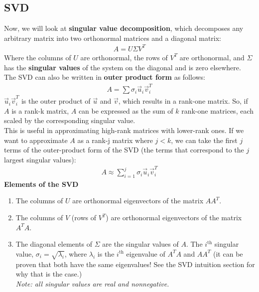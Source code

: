 \subsection*{SVD}
Now, we will look at \textbf{singular value decomposition}, which decomposes any arbitrary matrix into two orthonormal matrices and a diagonal matrix:
\begin{align*}
    \boxed{A = U \Sigma V^T} 
\end{align*}
Where the columns of $U$ are orthonormal, the rows of $V^T$ are orthonormal, and $\Sigma$ has the \textbf{singular values} of the system on the diagonal and is zero elsewhere. \\
\newline
The SVD can also be written in \textbf{outer product form} as follows:
\begin{align*}
    \boxed{A = \sum \sigma_i \vec{u}_i \vec{v}^T_i}
\end{align*}
$\vec{u}_i \vec{v}^T_i$ is the outer product of $\vec{u}$ and $\vec{v}$, which results in a rank-one matrix. So, if $A$ is a rank-k matrix, $A$ can be expressed as the sum of $k$ rank-one matrices, each scaled by the corresponding singular value. \\
\newline
This is useful in approximating high-rank matrices with lower-rank ones. If we want to approximate $A$ as a rank-j matrix where $j < k$, we can take the first $j$ terms of the outer-product form of the SVD (the terms that correspond to the $j$ largest singular values):
\begin{align*}
    \boxed{A \approx \sum_{i = 1}^{j} \sigma_i \vec{u}_i \vec{v}^T_i}
\end{align*}
\newline
\textbf{Elements of the SVD}
\begin{enumerate}
    \item The columns of $U$ are orthonormal eigenvectors of the matrix $AA^T$.
    \item The columns of $V$ (rows of $V^T$) are orthonormal eigenvectors of the matrix $A^T A$.
    \item The diagonal elements of $\Sigma$ are the singular values of $A$. The $i^{\text{th}}$ singular value, $\sigma_i = \sqrt{\lambda_i}$, where $\lambda_i$ is the $i^{\text{th}}$ eigenvalue of $A^T A$ and $A A^T$ (it can be proven that both have the same eigenvalues! See the SVD intuition section for why that is the case.) \\
    \textit{Note: all singular values are real and nonnegative.}
\end{enumerate}

